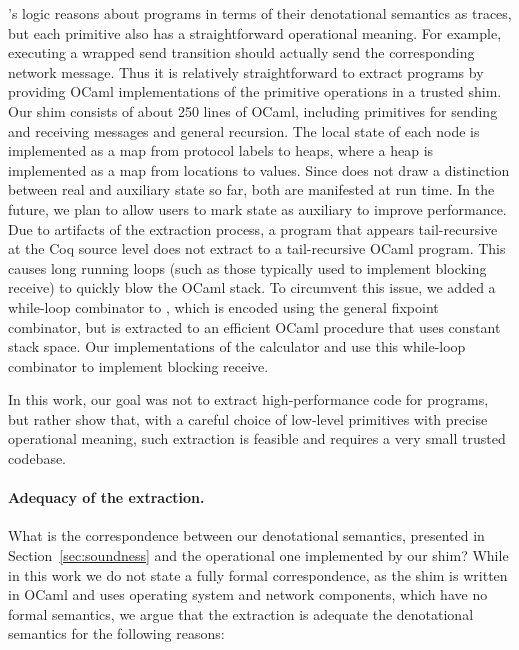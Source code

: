 \disel's logic reasons about programs in terms of their denotational
semantics as traces, but each primitive also has a
straightforward operational meaning.
%
For example, executing a wrapped send transition should actually send
the corresponding network message.
%
Thus it is relatively straightforward to extract \disel programs by
providing OCaml implementations of the primitive operations in a
trusted shim.
%
Our shim consists of about 250 lines of OCaml, including primitives
for sending and receiving messages and general recursion.
%
The local state of each node is implemented as a map from protocol
labels to heaps, where a heap is implemented as a map from locations
to values.
%
Since \disel does not draw a distinction between real and auxiliary
state so far, both are manifested at run time.
%
In the future, we plan to allow users to mark state as auxiliary to
improve performance.
%
Due to artifacts of the extraction process, a \disel program that
appears tail-recursive at the Coq source level does not extract to a
tail-recursive OCaml program.
%
This causes long running loops (such as those typically used to
implement blocking receive) to quickly blow the OCaml stack.
%
To circumvent this issue, we added a while-loop combinator to \disel,
which is encoded using the general fixpoint combinator, but is extracted to
an efficient OCaml procedure that uses constant stack space.
%
Our implementations of the calculator and  use this
while-loop combinator to implement blocking receive.
%

In this work, our goal was not to extract high-performance code for
\disel programs, but rather show that, with a careful choice of
low-level primitives with precise operational meaning, such extraction
is feasible and requires a very small trusted codebase.
%

\paragraph{Adequacy of the extraction.~}

What is the correspondence between our denotational semantics,
presented in Section~\ref{sec:soundness} and the operational one
implemented by our shim?
%
%
While in this work we do not state a fully formal correspondence, as
the shim is written in OCaml and uses operating system and network
components, which have no formal semantics, we argue that the
extraction is adequate \wrt the denotational semantics for the
following reasons:

